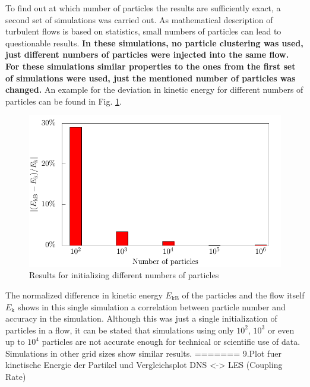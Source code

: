 \documentclass[11pt,a4paper,openany,oneside,parskip=half*]{article}
\begin{document}
\newline
To find out at which number of particles the results are sufficiently exact, a second set of simulations was carried out. As mathematical description of turbulent flows is based on statistics, small numbers of particles can lead to questionable results. \textbf{In these simulations, no particle clustering was used, just different numbers of particles were injected into the same flow. For these simulations similar properties to the ones from the first set of simulations were used, just the mentioned number of particles was changed.} An example for the deviation in kinetic energy for different numbers of particles can be found in Fig. \ref{kineticEnergy_numberOfParticles}. 
\begin{figure}[h]
	\centering
  \includegraphics[width=\textwidth]{./../Simulationsergebnisse/variationPartikelAnzahl/128/kineticEnergy_numberOfParticles.pdf}
	\caption{Results for initializing different numbers of particles}
	\label{kineticEnergy_numberOfParticles}
\end{figure}
The normalized difference in kinetic energy $E_\mathrm{kB}$ of the particles and the flow itself $E_\mathrm{k}$ shows in this single simulation a correlation between particle number and accuracy in the simulation. Although this was just a single initialization of particles in a flow, it can be stated that simulations using only $10^2$, $10^3$ or even up to $10^4$ particles are not accurate enough for technical or scientific use of data. Simulations in other grid sizes show similar results.
=======
\newline
9.Plot fuer kinetische Energie der Partikel und Vergleichsplot DNS <-> LES (Coupling Rate)
\newline
\end{document}
